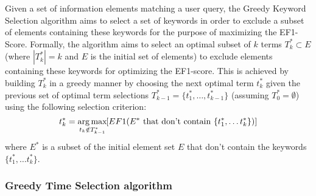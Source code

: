 Given a set of information elements matching a user query, the Greedy Keyword Selection algorithm aims to select a set of keywords  in order to exclude a subset of elements containing these keywords for the purpose of maximizing the EF1-Score. 
Formally, the algorithm aims to select an
optimal subset of $k$ terms $T_{k}^{*}\subset E$ (where $|T_{k}^{*}|=k$ and $E$ is the initial set of elements) to exclude elements containing these keywords for optimizing the EF1-score. This is achieved by
building $T_{k}^{*}$ in a greedy manner by choosing the next optimal
term $t_{k}^{*}$ given the previous set of optimal term selections
$T_{k-1}^{*}=\{t_{1}^{*},\ldots,t_{k-1}^{*}\}$ (assuming $T_{0}^{*}=\emptyset$)
using the following selection criterion:
\begin{equation}
t_{k}^{*}=\operatorname*{arg\,max}_{t_{k}\notin T_{k-1}^{*}}\hspace{-0.3mm}[EF1(E^{*} \textrm{ that don't contain } \{t_{1}^{*},\dots t_{k}^{*}\})]
\end{equation}
where  $E^{*}$ is a subset of the initial element set $E$ that don't contain the keywords $\{t_{1}^{*},\dots t_{k}^{*}\}$. 

\subsubsection{Greedy Time Selection algorithm}

